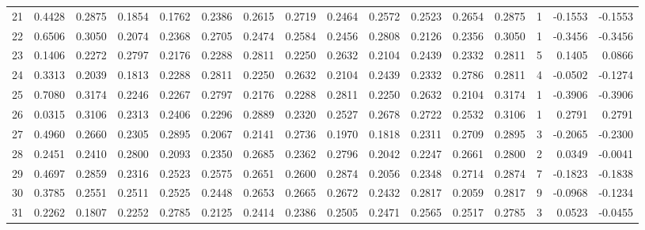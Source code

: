 \begin{tabular}{lrrrrrrrrrrrrrrr}
21  &      0.4428 &  0.2875 &  0.1854 &  0.1762 &  0.2386 &  0.2615 &  0.2719 &  0.2464 &  0.2572 &  0.2523 &   0.2654 &     0.2875 &      1 &                   -0.1553 &                    -0.1553 \\
22  &      0.6506 &  0.3050 &  0.2074 &  0.2368 &  0.2705 &  0.2474 &  0.2584 &  0.2456 &  0.2808 &  0.2126 &   0.2356 &     0.3050 &      1 &                   -0.3456 &                    -0.3456 \\
23  &      0.1406 &  0.2272 &  0.2797 &  0.2176 &  0.2288 &  0.2811 &  0.2250 &  0.2632 &  0.2104 &  0.2439 &   0.2332 &     0.2811 &      5 &                    0.1405 &                     0.0866 \\
24  &      0.3313 &  0.2039 &  0.1813 &  0.2288 &  0.2811 &  0.2250 &  0.2632 &  0.2104 &  0.2439 &  0.2332 &   0.2786 &     0.2811 &      4 &                   -0.0502 &                    -0.1274 \\
25  &      0.7080 &  0.3174 &  0.2246 &  0.2267 &  0.2797 &  0.2176 &  0.2288 &  0.2811 &  0.2250 &  0.2632 &   0.2104 &     0.3174 &      1 &                   -0.3906 &                    -0.3906 \\
26  &      0.0315 &  0.3106 &  0.2313 &  0.2406 &  0.2296 &  0.2889 &  0.2320 &  0.2527 &  0.2678 &  0.2722 &   0.2532 &     0.3106 &      1 &                    0.2791 &                     0.2791 \\
27  &      0.4960 &  0.2660 &  0.2305 &  0.2895 &  0.2067 &  0.2141 &  0.2736 &  0.1970 &  0.1818 &  0.2311 &   0.2709 &     0.2895 &      3 &                   -0.2065 &                    -0.2300 \\
28  &      0.2451 &  0.2410 &  0.2800 &  0.2093 &  0.2350 &  0.2685 &  0.2362 &  0.2796 &  0.2042 &  0.2247 &   0.2661 &     0.2800 &      2 &                    0.0349 &                    -0.0041 \\
29  &      0.4697 &  0.2859 &  0.2316 &  0.2523 &  0.2575 &  0.2651 &  0.2600 &  0.2874 &  0.2056 &  0.2348 &   0.2714 &     0.2874 &      7 &                   -0.1823 &                    -0.1838 \\
30  &      0.3785 &  0.2551 &  0.2511 &  0.2525 &  0.2448 &  0.2653 &  0.2665 &  0.2672 &  0.2432 &  0.2817 &   0.2059 &     0.2817 &      9 &                   -0.0968 &                    -0.1234 \\
31  &      0.2262 &  0.1807 &  0.2252 &  0.2785 &  0.2125 &  0.2414 &  0.2386 &  0.2505 &  0.2471 &  0.2565 &   0.2517 &     0.2785 &      3 &                    0.0523 &                    -0.0455 \\

\end{tabular}
